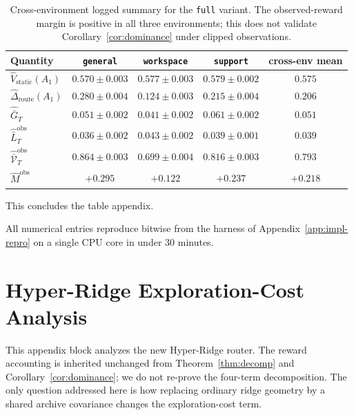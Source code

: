 \documentclass{article} %
\begin{document}
\begin{table}[h]
\centering
\small
\begin{tabular}{lcccc}
\toprule
Quantity & \texttt{general} & \texttt{workspace} & \texttt{support} & cross-env mean \\
\midrule
$\widehat V_{\mathrm{static}}(A_1)$    & $0.570\pm 0.003$ & $0.577\pm 0.003$ & $0.579\pm 0.002$ & $0.575$ \\
$\widehat\Delta_{\mathrm{route}}(A_1)$   & $0.280\pm 0.004$ & $0.124\pm 0.003$ & $0.215\pm 0.004$ & $0.206$ \\
$\widehat{\bar G}_T$                   & $0.051\pm 0.002$ & $0.041\pm 0.002$ & $0.061\pm 0.002$ & $0.051$ \\
$\widehat{\bar L}_T^{\mathrm{obs}}$                   & $0.036\pm 0.002$ & $0.043\pm 0.002$ & $0.039\pm 0.001$ & $0.039$ \\
$\widehat{\bar{\mathcal V}}_T^{\mathrm{obs}}$         & $0.864\pm 0.003$ & $0.699\pm 0.004$ & $0.816\pm 0.003$ & $0.793$ \\
$\widehat M^{\mathrm{obs}}$                           & $+0.295$ & $+0.122$ & $+0.237$ & $+0.218$ \\
\bottomrule
\end{tabular}
\caption{Cross-environment logged summary for the \texttt{full} variant. The
observed-reward margin is positive in all three environments; this does not
validate Corollary~\ref{cor:dominance} under clipped observations.}
\label{tab:app-summary}
\end{table}

This concludes the table appendix.

All numerical entries reproduce bitwise from the harness of Appendix~\ref{app:impl-repro} on a single CPU core in under $30$ minutes.

\clearpage

\section{Hyper-Ridge Exploration-Cost Analysis}
\label{app:hyper-proofs}

This appendix block analyzes the new Hyper-Ridge router.  The reward accounting is inherited unchanged from Theorem~\ref{thm:decomp} and Corollary~\ref{cor:dominance}; we do not re-prove the four-term decomposition.  The only question addressed here is how replacing ordinary ridge geometry by a shared archive covariance changes the exploration-cost term.
\end{document}
